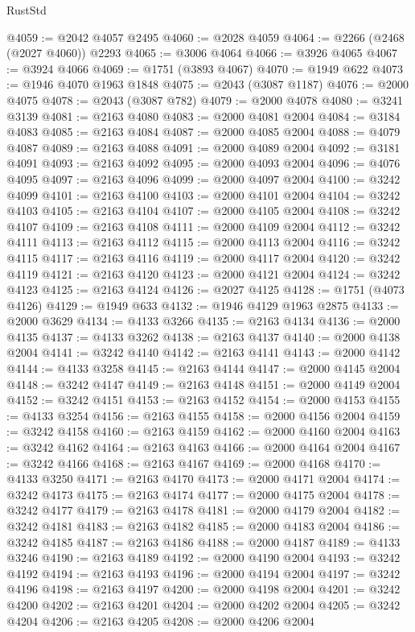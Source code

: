 \begin{lexlean}{RustStd}
\begin{coremodule}
@4059 := @2042 @4057 @2495
@4060 := @2028 @4059
@4064 := @2266 (@2468 (@2027 @4060)) @2293
@4065 := @3006 @4064
@4066 := @3926 @4065
@4067 := @3924 @4066
@4069 := @1751 (@3893 @4067)
@4070 := @1949 @622
@4073 := @1946 @4070 @1963 @1848
@4075 := @2043 (@3087 @1187)
@4076 := @2000 @4075
@4078 := @2043 (@3087 @782)
@4079 := @2000 @4078
@4080 := @3241 @3139
@4081 := @2163 @4080
@4083 := @2000 @4081 @2004
@4084 := @3184 @4083
@4085 := @2163 @4084
@4087 := @2000 @4085 @2004
@4088 := @4079 @4087
@4089 := @2163 @4088
@4091 := @2000 @4089 @2004
@4092 := @3181 @4091
@4093 := @2163 @4092
@4095 := @2000 @4093 @2004
@4096 := @4076 @4095
@4097 := @2163 @4096
@4099 := @2000 @4097 @2004
@4100 := @3242 @4099
@4101 := @2163 @4100
@4103 := @2000 @4101 @2004
@4104 := @3242 @4103
@4105 := @2163 @4104
@4107 := @2000 @4105 @2004
@4108 := @3242 @4107
@4109 := @2163 @4108
@4111 := @2000 @4109 @2004
@4112 := @3242 @4111
@4113 := @2163 @4112
@4115 := @2000 @4113 @2004
@4116 := @3242 @4115
@4117 := @2163 @4116
@4119 := @2000 @4117 @2004
@4120 := @3242 @4119
@4121 := @2163 @4120
@4123 := @2000 @4121 @2004
@4124 := @3242 @4123
@4125 := @2163 @4124
@4126 := @2027 @4125
@4128 := @1751 (@4073 @4126)
@4129 := @1949 @633
@4132 := @1946 @4129 @1963 @2875
@4133 := @2000 @3629
@4134 := @4133 @3266
@4135 := @2163 @4134
@4136 := @2000 @4135
@4137 := @4133 @3262
@4138 := @2163 @4137
@4140 := @2000 @4138 @2004
@4141 := @3242 @4140
@4142 := @2163 @4141
@4143 := @2000 @4142
@4144 := @4133 @3258
@4145 := @2163 @4144
@4147 := @2000 @4145 @2004
@4148 := @3242 @4147
@4149 := @2163 @4148
@4151 := @2000 @4149 @2004
@4152 := @3242 @4151
@4153 := @2163 @4152
@4154 := @2000 @4153
@4155 := @4133 @3254
@4156 := @2163 @4155
@4158 := @2000 @4156 @2004
@4159 := @3242 @4158
@4160 := @2163 @4159
@4162 := @2000 @4160 @2004
@4163 := @3242 @4162
@4164 := @2163 @4163
@4166 := @2000 @4164 @2004
@4167 := @3242 @4166
@4168 := @2163 @4167
@4169 := @2000 @4168
@4170 := @4133 @3250
@4171 := @2163 @4170
@4173 := @2000 @4171 @2004
@4174 := @3242 @4173
@4175 := @2163 @4174
@4177 := @2000 @4175 @2004
@4178 := @3242 @4177
@4179 := @2163 @4178
@4181 := @2000 @4179 @2004
@4182 := @3242 @4181
@4183 := @2163 @4182
@4185 := @2000 @4183 @2004
@4186 := @3242 @4185
@4187 := @2163 @4186
@4188 := @2000 @4187
@4189 := @4133 @3246
@4190 := @2163 @4189
@4192 := @2000 @4190 @2004
@4193 := @3242 @4192
@4194 := @2163 @4193
@4196 := @2000 @4194 @2004
@4197 := @3242 @4196
@4198 := @2163 @4197
@4200 := @2000 @4198 @2004
@4201 := @3242 @4200
@4202 := @2163 @4201
@4204 := @2000 @4202 @2004
@4205 := @3242 @4204
@4206 := @2163 @4205
@4208 := @2000 @4206 @2004

\end{coremodule}
\end{lexlean}
